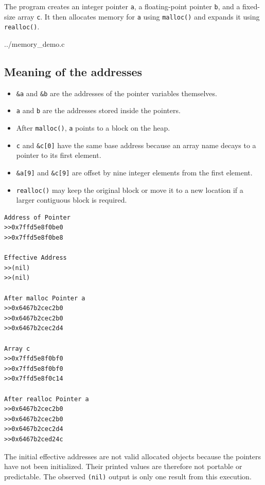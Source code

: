\documentclass[12pt,a4paper]{article}
\begin{document}
The program creates an integer pointer \texttt{a}, a floating-point pointer
\texttt{b}, and a fixed-size array \texttt{c}. It then allocates memory for
\texttt{a} using \texttt{malloc()} and expands it using \texttt{realloc()}.


{../memory_demo.c}

\subsection{Meaning of the addresses}

\begin{itemize}[leftmargin=*]
    \item \texttt{\&a} and \texttt{\&b} are the addresses of the pointer variables themselves.
    \item \texttt{a} and \texttt{b} are the addresses stored inside the pointers.
    \item After \texttt{malloc()}, \texttt{a} points to a block on the heap.
    \item \texttt{c} and \texttt{\&c[0]} have the same base address because an array name decays to a pointer to its first element.
    \item \texttt{\&a[9]} and \texttt{\&c[9]} are offset by nine integer elements from the first element.
    \item \texttt{realloc()} may keep the original block or move it to a new location if a larger contiguous block is required.
\end{itemize}

\begin{lstlisting}[style=terminal,caption={Memory allocation output before enabling b}]
Address of Pointer
>>0x7ffd5e8f0be0
>>0x7ffd5e8f0be8

Effective Address
>>(nil)
>>(nil)

After malloc Pointer a
>>0x6467b2cec2b0
>>0x6467b2cec2b0
>>0x6467b2cec2d4

Array c
>>0x7ffd5e8f0bf0
>>0x7ffd5e8f0bf0
>>0x7ffd5e8f0c14

After realloc Pointer a
>>0x6467b2cec2b0
>>0x6467b2cec2b0
>>0x6467b2cec2d4
>>0x6467b2ced24c
\end{lstlisting}

The initial effective addresses are not valid allocated objects because the
pointers have not been initialized. Their printed values are therefore not
portable or predictable. The observed \texttt{(nil)} output is only one result
from this execution.
\end{document}
